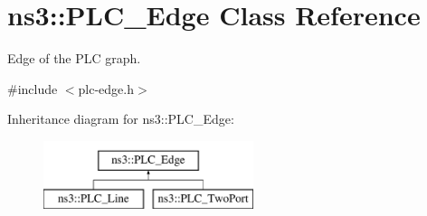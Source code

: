 \hypertarget{classns3_1_1PLC__Edge}{\section{ns3\-:\-:\-P\-L\-C\-\_\-\-Edge \-Class \-Reference}
\label{classns3_1_1PLC__Edge}
}


\-Edge of the \-P\-L\-C graph.  




{\ttfamily \#include $<$plc-\/edge.\-h$>$}

\-Inheritance diagram for ns3\-:\-:\-P\-L\-C\-\_\-\-Edge\-:\begin{figure}[H]
\begin{center}
\leavevmode
\includegraphics[height=2.000000cm]{classns3_1_1PLC__Edge}
\end{center}
\end{figure}
